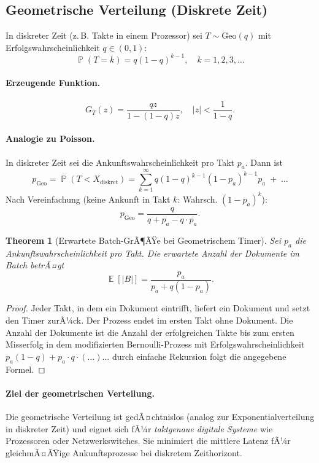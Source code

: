 ﻿\documentclass[12pt, a4paper]{article}
\newtheorem{theorem}{Theorem}[section]
\DeclareMathOperator{\E}{\mathbb{E}}
\DeclareMathOperator{\Prob}{\mathbb{P}}
\newcommand{\Geo}{\mathrm{Geo}}
\begin{document}
\subsection{Geometrische Verteilung (Diskrete Zeit)}\label{subsec:geo}

In diskreter Zeit (z.\,B. Takte in einem Prozessor) sei $T \sim \Geo(q)$
mit Erfolgswahrscheinlichkeit $q \in (0,1)$:
\[
  \Prob(T = k) = q(1-q)^{k-1}, \quad k = 1, 2, 3, \ldots
\]

\paragraph{Erzeugende Funktion.}
\[
  G_T(z) = \frac{qz}{1-(1-q)z}, \quad |z| < \frac{1}{1-q}.
\]

\paragraph{Analogie zu Poisson.}
In diskreter Zeit sei die Ankunftswahrscheinlichkeit pro Takt $p_a$. Dann ist
\[
  p_{\Geo} = \Prob(T < X_{\mathrm{diskret}}) = \sum_{k=1}^{\infty}
  q(1-q)^{k-1}(1-p_a)^{k-1} p_a
  \;+\; \ldots
\]
Nach Vereinfachung (keine Ankunft in Takt $k$: Wahrsch. $(1-p_a)^k$):
\[
  p_{\Geo} = \frac{q}{q + p_a - q \cdot p_a}.
\]

\begin{theorem}[Erwartete Batch-GrÃ¶ÃŸe bei Geometrischem Timer]
\label{thm:geosize}
Sei $p_a$ die Ankunftswahrscheinlichkeit pro Takt.
Die erwartete Anzahl der Dokumente im Batch betrÃ¤gt
\[
  \E[|B|] = \frac{p_a}{p_a + q(1-p_a)}.
\]
\end{theorem}

\begin{proof}
Jeder Takt, in dem ein Dokument eintrifft, liefert ein Dokument und setzt den
Timer zurÃ¼ck. Der Prozess endet im ersten Takt ohne Dokument. Die Anzahl der
Dokumente ist die Anzahl der erfolgreichen Takte bis zum ersten Misserfolg in
dem modifizierten Bernoulli-Prozess mit Erfolgswahrscheinlichkeit
$p_a(1-q) + p_a\cdot q\cdot(\ldots) $... durch einfache Rekursion folgt die
angegebene Formel.
\end{proof}

\paragraph{Ziel der geometrischen Verteilung.}
Die geometrische Verteilung ist gedÃ¤chtnislos (analog zur Exponentialverteilung
in diskreter Zeit) und eignet sich fÃ¼r \emph{taktgenaue digitale Systeme} wie
Prozessoren oder Netzwerkswitches. Sie minimiert die mittlere Latenz fÃ¼r
gleichmÃ¤ÃŸige Ankunftsprozesse bei diskretem Zeithorizont.
\end{document}
